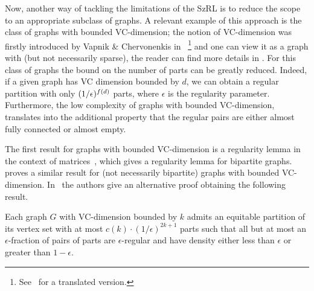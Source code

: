        Now, another way of tackling the limitations of the SzRL is to reduce the scope to an appropriate subclass of graphs.
        A relevant example of this approach is the class of graphs with bounded VC-dimension;
        the notion of VC-dimension was firstly introduced by Vapnik \& Chervonenkis
        in~\cite{the_uniform_convergence_of_frequencies_of_the_appearance_of_events_to_their_probabilities}
        \hspace{-3pt}\footnote{
            See~\cite{on_the_uniform_convergence_of_relative_frequencies_of_events_to_their_probabilities}
            for a translated version.}
        and one can view it as a graph with  (but not necessarily sparse), the reader can find more
        details in .
        For this class of graphs the bound on the number of parts can be greatly reduced.
        Indeed, if a given graph has VC dimension bounded by $d$, we can obtain a regular partition with only
        $( {1}/{\epsilon} )^{f(d)}$ parts, where $\epsilon$ is the regularity parameter.
        Furthermore, the low complexity of graphs with bounded VC-dimension, translates into the additional property that the
        regular pairs are either almost fully connected or almost empty.

        The first result for graphs with bounded VC-dimension is a regularity lemma in the context of
        matrices~\cite{efficient_testing_of_bipartite_graphs_for_forbidden_induced_subgraphs}, which gives
        a regularity lemma for bipartite graphs.
        \cite{regularity_partitions_and_the_topology_of_graphons} proves a similar result for (not necessarily bipartite)
        graphs with bounded VC-dimension.
        In~\cite{erdos_hajnal_conjecture_for_graphs_with_bounded_vc_dimension} the authors give
        an alternative proof obtaining the following result.

        \begin{theoremA}
            \label{thm:B}
            Each graph $G$ with VC-dimension bounded by $k$ admits an equitable partition of its vertex set with at most
            $c(k)\cdot(1/\epsilon)^{2k+1}$ parts such that all but at most an $\epsilon$-fraction of pairs of parts
            are $\epsilon$-regular and have density either less than $\epsilon$ or greater than $1 - \epsilon$.
        \end{theoremA}

